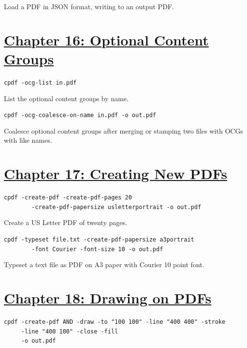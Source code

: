 \documentclass{book}
\begin{document}
\noindent Load a PDF in JSON format, writing to an output PDF.

\section*{\hyperref[chap:16]{Chapter 16: Optional Content Groups}}

\begin{framed}\noindent\texttt{cpdf -ocg-list in.pdf}\end{framed}

\noindent List the optional content groups by name.

\begin{framed}\noindent\texttt{cpdf -ocg-coalesce-on-name in.pdf -o out.pdf}\end{framed}

\noindent Coalesce optional content groups after merging or stamping two files with OCGs with like names.

\section*{\hyperref[chap:17]{Chapter 17: Creating New PDFs}}

\begin{framed}
 \small\verb?cpdf -create-pdf -create-pdf-pages 20?\\
 \noindent\small\verb?        -create-pdf-papersize usletterportrait -o out.pdf?
\end{framed}

\noindent Create a US Letter PDF of twenty pages.

\begin{framed}
 \small\verb?cpdf -typeset file.txt -create-pdf-papersize a3portrait?\\
 \noindent\small\verb?        -font Courier -font-size 10 -o out.pdf?
\end{framed}

\noindent Typeset a text file as PDF on A3 paper with Courier 10 point font.

\section*{\hyperref[chap:18]{Chapter 18: Drawing on PDFs}}

\begin{framed}
 \noindent\small\verb?cpdf -create-pdf AND -draw -to "100 100" -line "400 400" -stroke?\\
 \noindent\small\verb?     -line "400 100" -close -fill?\\
 \noindent\small\verb?     -o out.pdf?
\end{framed}
\end{document}
